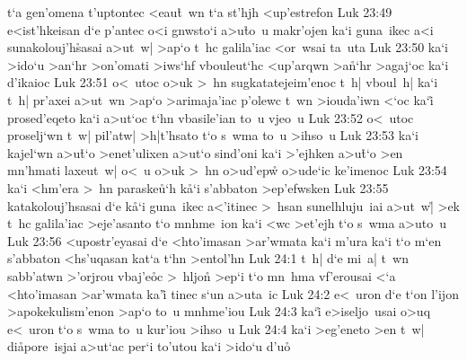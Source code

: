 t`a
gen'omena
t'uptontec
<eau\r{t}~wn
t`a
st'hjh
<up'estrefon\bibvsend
\vs Luk 23:49
e<ist'hkeisan
d`e
p'antec
o<i
gnwsto`i
a>u\r{t}o~u
makr'ojen
ka`i
guna~ikec
a<i
sunakolouj'h\r{s}asai
a>ut~w|
>ap`o
t~hc
galila'iac
<or~wsai
ta~uta\bibvsend
\vs Luk 23:50
ka`i
>ido`u
>an`hr
>on'omati
>iws`hf
vbouleut`hc
<up'arqwn
>a\r{n}`hr
>agaj`oc
ka`i
d'ikaioc\bibvsend
\vs Luk 23:51
o<~utoc
o>uk
>~hn
sugkatatejeim'enoc
t~h|
vboul~h|
ka`i
t~h|
pr'axei
a>ut~wn
>ap`o
>arimaja'iac
p'olewc
t~wn
>iouda'iwn
<`oc
ka`i\r{}
prosed'eqeto
ka`i
a>ut`oc
t`hn
vbasile'ian
to~u
vjeo~u\bibvsend
\vs Luk 23:52
o<~utoc
proselj`wn
t~w|
pil'atw|
>h|t'hsato
t`o
s~wma
to~u
>ihso~u\bibvsend
\vs Luk 23:53
ka`i
kajel`wn
a>u\r{t}`o
>enet'ulixen
a>ut`o
sind'oni
ka`i
>'ejhken
a>u\r{t}`o
>en
mn'hmati
laxeut~w|
o<~u
o>uk
>~hn
o>ud'epw\r{}
o>ude`ic
ke'imenoc\bibvsend
\vs Luk 23:54
ka`i
<hm'era
>~hn
paraske\r{u}`h
k\r{a}`i
s'abbaton
>ep'efwsken\bibvsend
\vs Luk 23:55
katakolouj'hsasai
d`e
k\r{a}`i
guna~ikec
a<'itinec
>~hsan
sunelhluju~iai
a>ut~w|\r{}
>ek
t~hc
galila'iac
>eje'asanto
t`o
mnhme~ion
ka`i
<wc
>et'ejh
t`o
s~wma
a>uto~u\bibvsend
\vs Luk 23:56
<upostr'eyasai
d`e
<hto'imasan
>ar'wmata
ka`i
m'ura
ka`i
t`o
m`en
s'abbaton
<hs'uqasan
kat`a
t`hn
>entol'hn\bibvsend
\vs Luk 24:1
t~h|
d`e
mi~a|
t~wn
sabb'atwn
>'orjrou
vbaj'e\r{o}c
>~hljon\r{}
>ep`i
t`o
mn~hma
vf'erousai
<`a
<hto'imasan
>ar'wmata
ka'i\r{}
tinec
s`un
a>uta~ic\bibvsend
\vs Luk 24:2
e<~uron
d`e
t`on
l'ijon
>apokekulism'enon
>ap`o
to~u
mnhme'iou\bibvsend
\vs Luk 24:3
ka`i\r{}
e>iseljo~usai
o>uq
e<~uron
t`o
s~wma
to~u
kur'iou
>ihso~u\bibvsend
\vs Luk 24:4
ka`i
>eg'eneto
>en
t~w|
di\r{a}pore~isjai
a>ut`ac
per`i
to'utou
ka`i
>ido`u
d'uo\r{}

